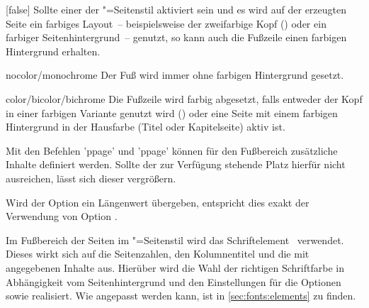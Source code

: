 \begin{Declaration*}{}
\begin{Declaration*}{}
\begin{Declaration*}{}
\begin{Declaration}[%
  v2.03!\Option{cdfoot=color}:farbiger Hintergrund der Fußzeile;%
  v2.03!\Option{cdfoot=\PValueName{Höhe}};%
]{}[false]
Sollte einer der "=Seitenstil aktiviert sein und es wird 
auf der erzeugten Seite ein farbiges Layout~--  beispielsweise der zweifarbige 
Kopf () oder ein farbiger Seitenhintergrund~-- genutzt, 
so kann auch die Fußzeile einen farbigen Hintergrund erhalten.
%
\begin{values}{}
\item[nocolor/monochrome]
  Der Fuß wird immer ohne farbigen Hintergrund gesetzt.
\item[color/bicolor/bichrome]
  Die Fußzeile wird farbig abgesetzt, falls entweder der Kopf in einer farbigen
  Variante genutzt wird () oder eine Seite mit einem 
  farbigen Hintergrund in der Hausfarbe (Titel oder Kapitelseite) aktiv ist.
\end{values}
%
Mit den Befehlen 'ppage' und 'ppage' können 
für den Fußbereich zusätzliche Inhalte definiert werden. Sollte der zur 
Verfügung stehende Platz hierfür nicht ausreichen, lässt sich dieser vergrößern.
%
\begin{values}{}
\item[\PValueName{Höhe}]
  Wird der Option ein Längenwert übergeben, entspricht dies exakt der 
  Verwendung von Option .
\end{values}
\end{Declaration}

\begin{Declaration}[v2.04]{}
\printdeclarationlist%
%
%
Im Fußbereich der Seiten im "=Seitenstil wird das 
Schriftelement~ verwendet. Dieses wirkt sich auf die 
Seitenzahlen, den Kolumnentitel und die mit  angegebenen 
Inhalte aus. Hierüber wird die Wahl der richtigen Schriftfarbe in Abhängigkeit 
vom Seitenhintergrund und den Einstellungen für die Optionen  
sowie  realisiert. Wie  angepasst werden 
kann, ist in \autoref{sec:fonts:elements} zu finden.
\end{Declaration}


\end{Declaration*}
\end{Declaration*}
\end{Declaration*}
